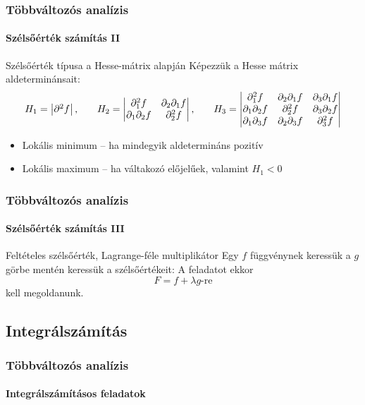 \begin{frame}
  \frametitle{Többváltozós analízis}
  \framesubtitle{Szélsőérték számítás II}

  \begin{block}{Szélsőérték típusa a Hesse-mátrix alapján}
    Képezzük a Hesse mátrix aldeterminánsait:
    \def\arraystretch{1.25}
    \[
      H_1 = \begin{vmatrix}
        \partial^2 f
      \end{vmatrix}
      \text,
      \mathbf{\qquad}
      H_2 = \begin{vmatrix}
        \partial^2_1 f          & \partial_2 \partial_1 f \\
        \partial_1 \partial_2 f & \partial^2_2 f
      \end{vmatrix}
      \text,
      \qquad
      H_3 = \begin{vmatrix}
        \partial^2_1 f          & \partial_2 \partial_1 f & \partial_3 \partial_1 f \\
        \partial_1 \partial_2 f & \partial^2_2 f          & \partial_3 \partial_2 f \\
        \partial_1 \partial_3 f & \partial_2 \partial_3 f & \partial^2_3 f
      \end{vmatrix}
    \]

    \begin{itemize}
      \item Lokális minimum -- ha mindegyik aldetermináns pozitív
      \item Lokális maximum -- ha váltakozó előjelűek, valamint $H_1 < 0$
    \end{itemize}
  \end{block}

  
\end{frame}

\begin{frame}
  \frametitle{Többváltozós analízis}
  \framesubtitle{Szélsőérték számítás III}

  \begin{block}{Feltételes szélsőérték, Lagrange-féle multiplikátor}
    Egy $f$ függvénynek keressük a $g$ görbe mentén keressük a szélsőértékeit:
    A feladatot ekkor
    \[
      F = f + \lambda g\text{-re}
    \]
    kell megoldanunk.
  \end{block}

  
\end{frame}

%

\subsection{Integrálszámítás}

\begin{frame}
  \frametitle{Többváltozós analízis}
  \framesubtitle{Integrálszámításos feladatok}

  
  
\end{frame}
